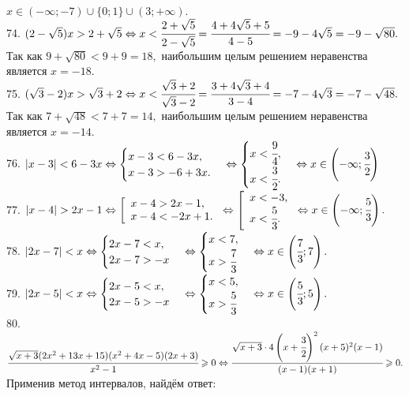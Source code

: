 $x\in(-\infty;-7)\cup\{0;1\}\cup(3;+\infty).$\\
74. $(2-\sqrt{5})x>2+\sqrt{5}\Leftrightarrow x<\cfrac{2+\sqrt{5}}{2-\sqrt{5}}=\cfrac{4+4\sqrt{5}+5}{4-5}=-9-4\sqrt{5}=-9-\sqrt{80}.$ Так как $9+\sqrt{80}<9+9=18,$
наибольшим целым решением неравенства является $x=-18.$\\
75. $(\sqrt{3}-2)x>\sqrt{3}+2\Leftrightarrow x<\cfrac{\sqrt{3}+2}{\sqrt{3}-2}=\cfrac{3+4\sqrt{3}+4}{3-4}=-7-4\sqrt{3}=-7-\sqrt{48}.$ Так как $7+\sqrt{48}<7+7=14,$
наибольшим целым решением неравенства является $x=-14.$\\
76. $|x-3|<6-3x\Leftrightarrow\begin{cases} x-3<6-3x,\\x-3>-6+3x.\end{cases}
\Leftrightarrow\begin{cases} x<\cfrac{9}{4},\\ x<\cfrac{3}{2}.\end{cases}\Leftrightarrow x\in\left(-\infty;\cfrac{3}{2}\right)$\\
77. $|x-4|>2x-1\Leftrightarrow\left[\begin{array}{l}x-4>2x-1,\\x-4<-2x+1.\end{array}\right.
\Leftrightarrow\left[\begin{array}{l}x<-3,\\x<\cfrac{5}{3}.\end{array}\right.\Leftrightarrow x\in\left(-\infty;\cfrac{5}{3}\right).$\\
78. $|2x-7|<x \Leftrightarrow \begin{cases} 2x-7<x,\\ 2x-7> -x\end{cases} \Leftrightarrow \begin{cases} x<7,\\ x>\cfrac{7}{3}\end{cases}
\Leftrightarrow x\in\left(\cfrac{7}{3};7\right).$\\
79. $|2x-5|<x \Leftrightarrow \begin{cases} 2x-5<x,\\ 2x-5> -x\end{cases} \Leftrightarrow \begin{cases} x<5,\\ x>\cfrac{5}{3}\end{cases}
\Leftrightarrow x\in\left(\cfrac{5}{3};5\right).$\\
80. $\cfrac{\sqrt{x+3}(2x^2+13x+15)(x^2+4x-5)(2x+3)}{x^2-1}\geqslant0 \Leftrightarrow \cfrac{\sqrt{x+3}\cdot4\left(x+\cfrac{3}{2}\right)^2(x+5)^2(x-1)}{(x-1)(x+1)}\geqslant0.$ Применив метод интервалов, найдём ответ:
